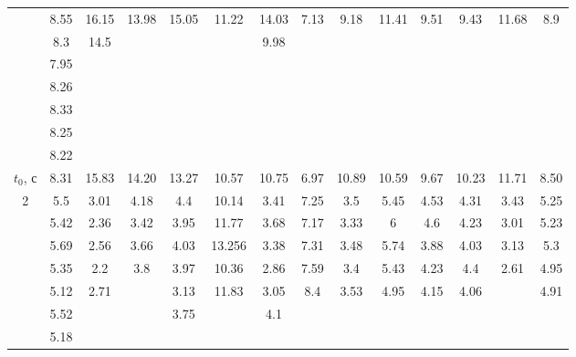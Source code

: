\documentclass[a4paper,12pt]{article}
\begin{document}
\begin{enumerate}
\begin{table}[t]
\begin{tabular}{|c|c|c|c|c|c|c|c|c|c|c|c|c|c|}
                   & 8.55 & 16.15 & 13.98 & 15.05 & 11.22  & 14.03 & 7.13 & 9.18  & 11.41 & 9.51 & 9.43  & 11.68 & 8.9  \\ \cline{2-14} 
                   & 8.3  & 14.5  &       &       &        & 9.98  &      &       &       &      &       &       &      \\ \cline{2-14} 
                   & 7.95 &       &       &       &        &       &      &       &       &      &       &       &      \\ \cline{2-14} 
                   & 8.26 &       &       &       &        &       &      &       &       &      &       &       &      \\ \cline{2-14} 
                   & 8.33 &       &       &       &        &       &      &       &       &      &       &       &      \\ \cline{2-14} 
                   & 8.25 &       &       &       &        &       &      &       &       &      &       &       &      \\ \cline{2-14} 
                   & 8.22 &       &       &       &        &       &      &       &       &      &       &       &      \\ \hline
$t_0$, с              & 8.31 & 15.83 & 14.20 & 13.27 & 10.57  & 10.75 & 6.97 & 10.89 & 10.59 & 9.67 & 10.23 & 11.71 & 8.50 \\ \hline
2            & 5.5  & 3.01  & 4.18  & 4.4   & 10.14  & 3.41  & 7.25 & 3.5   & 5.45  & 4.53 & 4.31  & 3.43  & 5.25 \\ \hline
\multirow{10}{*}{} & 5.42 & 2.36  & 3.42  & 3.95  & 11.77  & 3.68  & 7.17 & 3.33  & 6     & 4.6  & 4.23  & 3.01  & 5.23 \\ \cline{2-14} 
                   & 5.69 & 2.56  & 3.66  & 4.03  & 13.256 & 3.38  & 7.31 & 3.48  & 5.74  & 3.88 & 4.03  & 3.13  & 5.3  \\ \cline{2-14} 
                   & 5.35 & 2.2   & 3.8   & 3.97  & 10.36  & 2.86  & 7.59 & 3.4   & 5.43  & 4.23 & 4.4   & 2.61  & 4.95 \\ \cline{2-14} 
                   & 5.12 & 2.71  &       & 3.13  & 11.83  & 3.05  & 8.4  & 3.53  & 4.95  & 4.15 & 4.06  &       & 4.91 \\ \cline{2-14} 
                   & 5.52 &       &       & 3.75  &        & 4.1   &      &       &       &      &       &       &      \\ \cline{2-14} 
                   & 5.18 &       &       &       &        &       &      &       &       &      &       &       &      \\ \cline{2-14} 

\end{tabular}
\end{table}
\end{enumerate}
\end{document}
